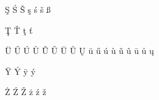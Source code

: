 \documentclass[a4paper,10pt]{article}
\newcommand{\page}{\newpage} %
\newcommand{\command}[2][]{#2\page}
\begin{document}
\command{\c{S}}
\command{\'{S}}
\command{\v{S}}
\command{\c{s}}
\command{\'{s}}
\command{\v{s}}
\command{\ss}\par
\command{\c{T}}
\command{\v{T}}
\command{\c{t}}
\command{\v{t}}\par
\command{\"{U}}
\command{\H{U}}
\command{\'{U}}
\command{\`{U}}
\command{\~{U}}
\command{\^{U}}
\command{\={U}}
\command{\r{U}}
\command{\k{U}}
\command{\"{u}}
\command{\H{u}}
\command{\'{u}}
\command{\`{u}}
\command{\~{u}}
\command{\^{u}}
\command{\={u}}
\command{\r{u}}
\command{\k{u}}\par
\command{\"{Y}}
\command{\'{Y}}
\command{\"{y}}
\command{\'{y}}\par
\command{\.{Z}}
\command{\'{Z}}
\command{\v{Z}}
\command{\.{z}}
\command{\'{z}}
\command{\v{z}}\par
\end{document}
